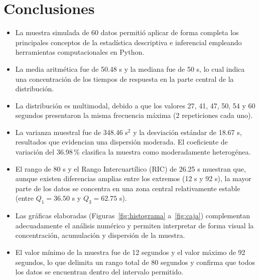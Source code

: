 \documentclass[12pt,letterpaper]{article}
\begin{document}
\section{Conclusiones}

\begin{itemize}[leftmargin=1.2cm]
    \item La muestra simulada de 60 datos permitió aplicar de forma completa los
          principales conceptos de la estadística descriptiva e inferencial empleando
          herramientas computacionales en Python.

    \item La media aritmética fue de 50.48 s y la mediana fue de 50 s, lo cual indica
          una concentración de los tiempos de respuesta en la parte central de la
          distribución.

    \item La distribución es multimodal, debido a que los valores 27, 41, 47, 50, 54
          y 60 segundos presentaron la misma frecuencia máxima (2 repeticiones
          cada uno).

    \item La varianza muestral fue de 348.46 s$^2$ y la desviación estándar de 18.67
          s, resultados que evidencian una dispersión moderada. El coeficiente de
          variación del 36.98\,\% clasifica la muestra como moderadamente heterogénea.

    \item El rango de 80 s y el Rango Intercuartílico (RIC) de 26.25 s muestran que,
          aunque existen diferencias amplias entre los extremos (12 s y 92 s), la
          mayor parte de los datos se concentra en una zona central relativamente
          estable (entre $Q_1 = 36.50$ s y $Q_3 = 62.75$ s).

    \item Las gráficas elaboradas (Figuras~\ref{fig:histograma} a~\ref{fig:caja})
          complementan adecuadamente el análisis numérico y permiten interpretar de
          forma visual la concentración, acumulación y dispersión de la muestra.

    \item El valor mínimo de la muestra fue de 12 segundos y el valor máximo de 92
          segundos, lo que delimita un rango total de 80 segundos y confirma que todos
          los datos se encuentran dentro del intervalo permitido.


\end{itemize}
\end{document}
